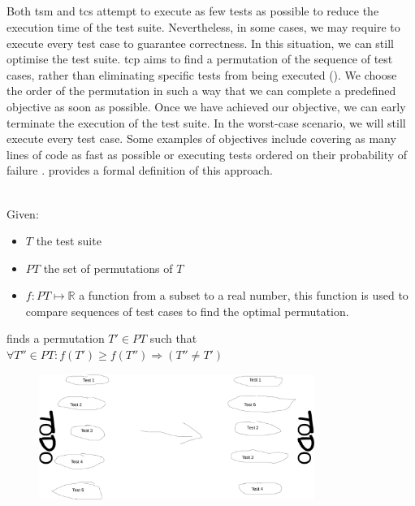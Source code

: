 
\subsection{\tcp{}}
Both \acrshort{tsm} and \acrshort{tcs} attempt to execute as few tests as possible to reduce the execution time of the test suite. Nevertheless, in some cases, we may require to execute every test case to guarantee correctness. In this situation, we can still optimise the test suite. \acrfull{tcp} aims to find a permutation of the sequence of test cases, rather than eliminating specific tests from being executed (). We choose the order of the permutation in such a way that we can complete a predefined objective as soon as possible. Once we have achieved our objective, we can early terminate the execution of the test suite. In the worst-case scenario, we will still execute every test case. Some examples of objectives include covering as many lines of code as fast as possible or executing tests ordered on their probability of failure \cite{10.1002/stv.430}.  provides a formal definition of this approach.

\begin{definition}[\tcp{}]
\label{def:tcp}
\mbox{}\\Given:
\begin{itemize}
	\item $T$ the test suite
	\item $PT$ the set of permutations of $T$
	\item $f: PT \mapsto \mathbb{R}$ a function from a subset to a real number, this function is used to compare sequences of test cases to find the optimal permutation.
\end{itemize}

\noindent \tcp{} finds a permutation $T' \in PT$ such that $\forall T'' \in PT : f(T') \ge f(T'') \Rightarrow (T'' \ne T')$ 
\end{definition}

\begin{figure}[htbp!]
	\centering
	\includegraphics[width=0.8\textwidth]{assets/images/approach-tcp.pdf}
	\caption{\tcp{}}
	\label{fig:tcp}
\end{figure}